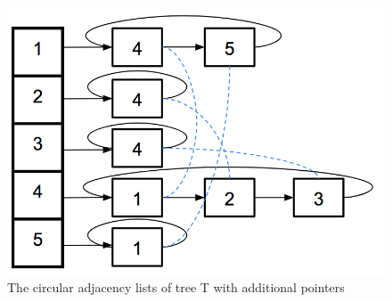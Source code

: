 \documentclass[twoside]{article}
\begin{document}
\begin{figure}[!ht]
\centering
\includegraphics[scale=0.4]{img/Euler3.png}
\caption{The circular adjacency lists of tree T with additional pointers} \label{fig:euler3} 
\end{figure}
\end{document}
